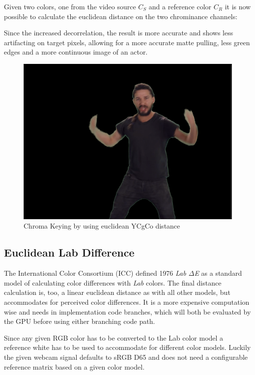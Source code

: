 Given two colors, one from the video source $C_S$ and a reference color $C_R$ 
it is now possible to calculate the euclidean distance on the two chrominance 
channels:


Since the increased decorrelation, the result is more accurate and shows less 
artifacting on target pixels, allowing for a more accurate matte pulling, less 
green edges and a more continuous image of an actor.

\begin{figure}[htb]
	\includegraphics[width=\textwidth]{_raw_resources/Comparison_YCgCo_color.png}
	\caption{Chroma Keying by using euclidean YCgCo distance}
	\label{fig:chroma:euclidean:ycgco}
\end{figure}

\subsection{Euclidean Lab Difference}
The International Color Consortium (ICC) defined 1976 \textit{Lab $\Delta$E} as 
a standard model of calculating color differences with \textit{Lab} colors. The 
final distance calculation is, too, a linear euclidean distance as with all 
other models, but accommodates for perceived color differences. It is a more 
expensive computation wise and needs in implementation code branches, which 
will both be evaluated by the GPU before using either branching code path.

Since any given RGB color has to be converted to  the Lab color model a 
reference white has to be used to accommodate for different color models. 
Luckily the given webcam signal defaults to sRGB D65 and does not need a 
configurable reference matrix based on a given color model.

